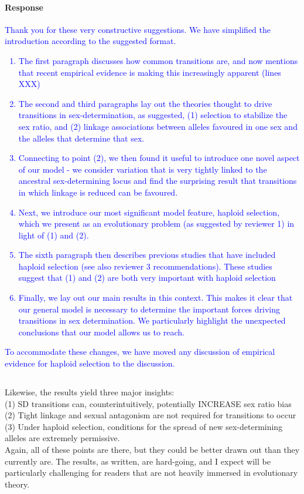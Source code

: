 \documentclass[10pt,letterpaper]{article}
\begin{document}
\noindent\paragraph{Response}
\textcolor{blue}{
Thank you for these very constructive suggestions. We have simplified the introduction according to the suggested format. 
\begin{enumerate}
\item{The first paragraph discusses how common transitions are, and now mentions that recent empirical evidence is making this increasingly apparent (lines XXX)}
\item{The second and third paragraphs lay out the theories thought to drive transitions in sex-determination, as suggested, (1) selection to stabilize the sex ratio, and (2) linkage associations between alleles favoured in one sex and the alleles that determine that sex. }
\item{Connecting to point (2), we then found it useful to introduce one novel aspect of our model - we consider variation that is very tightly linked to the ancestral sex-determining locus and find the surprising result that transitions in which linkage is reduced can be favoured.}
\item{Next, we introduce our most significant model feature, haploid selection, which we present as an evolutionary problem (as suggested by reviewer 1) in light of (1) and (2). }
\item{The sixth paragraph then describes previous studies that have included haploid selection (see also reviewer 3 recommendations). These studies suggest that (1) and (2) are both very important with haploid selection}
\item{Finally, we lay out our main results in this context. This makes it clear that our general model is necessary to determine the important forces driving transitions in sex determination. We particularly highlight the unexpected conclusions that our model allows us to reach. }
\end{enumerate}
To accommodate these changes, we have moved any discussion of empirical evidence for haploid selection to the discussion. 
}

\noindent\subsection{}
Likewise, the results yield three major insights:\\
(1) SD transitions can, counterintuitively, potentially INCREASE sex ratio bias\\
(2) Tight linkage and sexual antagonism are not required for transitions to occur\\
(3) Under haploid selection, conditions for the spread of new sex-determining alleles are extremely permissive.\\
Again, all of these points are there, but they could be better drawn out than they currently are. The results, as written, are hard-going, and I expect will be particularly challenging for readers that are not heavily immersed in evolutionary theory.
\end{document}
